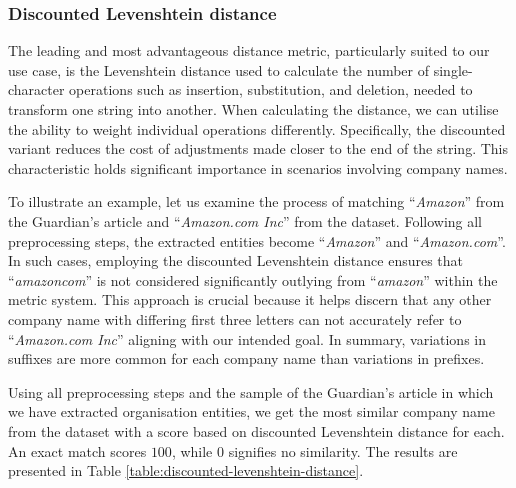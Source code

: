 \subsubsection*{Discounted Levenshtein distance}
\label{subsubsec:levenshtein-distance}
The leading and most advantageous distance metric, particularly suited to our use case, is the Levenshtein distance \parencite{levenshtein1966binary} used to calculate the number of single-character operations such as insertion, substitution, and deletion, needed to transform one string into another. When calculating the distance, we can utilise the ability to weight individual operations differently. Specifically, the discounted variant reduces the cost of adjustments made closer to the end of the string. This characteristic holds significant importance in scenarios involving company names.

To illustrate an example, let us examine the process of matching ``\textit{Amazon}'' from the Guardian's article and ``\textit{Amazon.com Inc}'' from the dataset. Following all preprocessing steps, the extracted entities become ``\textit{Amazon}'' and ``\textit{Amazon.com}''. In such cases, employing the discounted Levenshtein distance ensures that ``\textit{amazoncom}'' is not considered significantly outlying from ``\textit{amazon}'' within the metric system. This approach is crucial because it helps discern that any other company name with differing first three letters can not accurately refer to ``\textit{Amazon.com Inc}'' aligning with our intended goal. In summary, variations in suffixes are more common for each company name than variations in prefixes. 

Using all preprocessing steps and the sample of the Guardian's article in which we have extracted organisation entities, we get the most similar company name from the dataset with a score based on discounted Levenshtein distance for each. An exact match scores $100$, while $0$ signifies no similarity. The results are presented in Table \ref{table:discounted-levenshtein-distance}.

